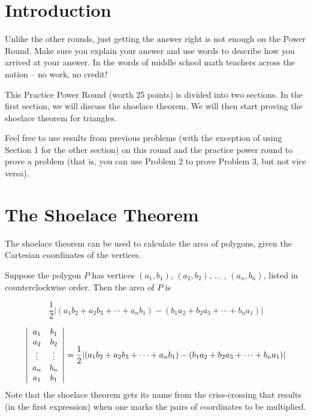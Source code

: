 \documentclass[11pt]{article}
\begin{document}
\section{Introduction}

Unlike the other rounds, just getting the answer right is not enough on the Power Round. Make sure you explain your answer and use words to describe how you arrived at your answer. In the words of middle school math teachers across the nation -- no work, no credit!

This Practice Power Round (worth 25 points) is divided into two sections. In the first section,  we will discuss the shoelace theorem. We will then start proving the shoelace theorem for triangles.

Feel free to use results from previous problems (with the exception of using Section 1 for the other section) on this round and the practice power round to prove a problem (that is, you can use Problem 2 to prove Problem 3, but not vice versa). 

\section{The Shoelace Theorem}
\noindent The shoelace theorem can be used to calculate the area of polygons, given the Cartesian coordinates of the vertices. 

\begin{theorem} Suppose the polygon $P$ has vertices $(a_1, b_1)$, $(a_2, b_2)$, ... , $(a_n, b_n)$, listed in counterclockwise order. Then the area of $P$ is

\[\dfrac{1}{2} |(a_1b_2 + a_2b_3 + \cdots + a_nb_1) - (b_1a_2 + b_2a_3 + \cdots + b_na_1)|\]
\end{theorem}
\begin{comment}
The Shoelace Theorem gets its name because if one lists the coordinates in a column, 
\begin{align*} 
(a_1 &, b_1) \\ 
(a_2 &, b_2) \\ 
& \vdots \\ 
(a_n &, b_n) \\ 
(a_1 &, b_1) \\ 
\end{align*} 
and marks the pairs of coordinates to be multiplied, the resulting image looks like laced-up shoes.
\end{comment}

\begin{definition}
\[\left|\begin{array}{c c}a_1  & b_1 \\ a_2 &  b_2 \\ \vdots & \vdots \\ a_n & b_n \\ a_1 & b_1 \\ \end{array}\right| = \dfrac{1}{2} |(a_1b_2 + a_2b_3 + \cdots + a_nb_1) - (b_1a_2 + b_2a_3 + \cdots + b_na_1)|\]
Note that the shoelace theorem gets its name from the criss-crossing that results (in the first expression) when one marks the pairs of coordinates to be multiplied.
\end{definition}
\end{document}
